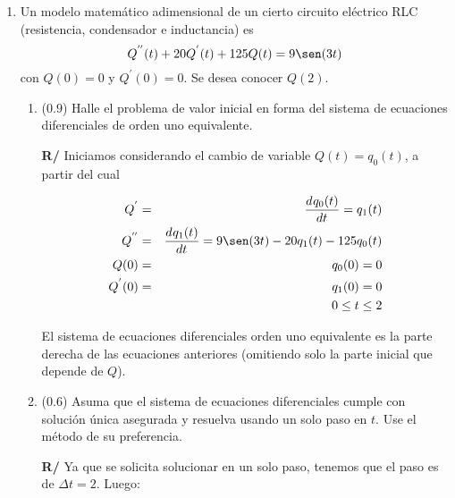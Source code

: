 \documentclass[12pt]{article}
\newcommand{\diff}[3]{\frac{d^{#3} #1}{d#2^{#3}}}
\begin{document}
\begin{enumerate}[leftmargin=*,widest=9]

\item Un modelo matemático adimensional de un cierto circuito eléctrico RLC (resistencia, condensador e inductancia) es $$Q^{''}(t)+20Q^{'}(t)+125Q(t)=9\sen(3t) $$ con $Q(0)=0$ y $Q^{'}(0)=0$. Se desea conocer \(Q(2)\).

    \begin{enumerate}[label=\alph*]
    \item (\(0.9\)) Halle el problema de valor inicial en forma del sistema de ecuaciones diferenciales de orden uno equivalente.
    

\textbf{R/} Iniciamos considerando el cambio de variable \(Q(t)=q_0(t)\), a partir del cual

\begin{eqnarray*}
Q^{'} &=& \diff{q_0(t)}{t}{} = q_1(t)\\
Q^{''} &=& \diff{q_1(t)}{t}{} = 9\sen(3t) - 20q_1(t) - 125 q_0(t)\\
Q(0) &=& q_0(0) = 0\\
Q^{'}(0) &=& q_1(0) = 0\\
&& 0 \leq t \leq 2
\end{eqnarray*}

El sistema de ecuaciones diferenciales orden uno equivalente es la parte derecha de las ecuaciones anteriores (omitiendo solo la parte inicial que depende de \(Q\)).

    
    \item (\(0.6\)) Asuma que el sistema de ecuaciones diferenciales cumple con solución única asegurada y resuelva usando un solo paso en \(t\). Use el método de su preferencia.
    

\textbf{R/} Ya que se solicita solucionar en un solo paso, tenemos que el paso es de \(\Delta t = 2\). Luego:


\end{enumerate}
\end{enumerate}
\end{document}
